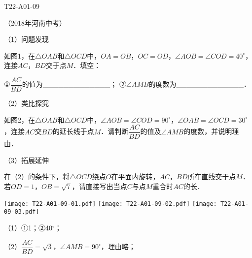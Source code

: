 \begin{defproblem}{T22-A01-09}%
\begin{onlyproblem}%
（2018年河南中考）

（1）问题发现

如图1，在$\triangle OAB$和$\triangle OCD$中，$OA=OB$，$OC=OD$，$\angle AOB=\angle COD=40^{\circ }$，连接$AC$，$BD$交于点$M$．填空：

①$\dfrac{AC}{BD}$的值为{\_}{\_}{\_}{\_}{\_}{\_}{\_}{\_}{\_}{\_}{\_}{\_}{\_}；
②$\angle AMB$的度数为{\_}{\_}{\_}{\_}{\_}{\_}{\_}{\_}{\_}{\_}{\_}{\_}{\_}．

（2）类比探究

如图2，在$\triangle OAB$和$\triangle OCD$中，$\angle AOB=\angle COD=90^{\circ }$，$\angle OAB=\angle OCD=30^{\circ }$，连接$AC$交$BD$的延长线于点$M$．请判断$\dfrac{AC}{BD}$的值及$\angle AMB$的度数，并说明理由．

（3）拓展延伸

在（2）的条件下，将$\triangle OCD$绕点$O$在平面内旋转，$AC$，$BD$所在直线交于点$M$．若$OD=1$，$OB=\sqrt 7 $，请直接写出当点$C$与点$M$重合时$AC$的长．


\begin{center}
\texttt{[image: T22-A01-09-01.pdf]}\qquad
\texttt{[image: T22-A01-09-02.pdf]}\qquad
\texttt{[image: T22-A01-09-03.pdf]}
\end{center}



\end{onlyproblem}%
\begin{onlysolution}%
（1）①1；②40$^{\circ }$；

（2）$\dfrac{AC}{BD}=\sqrt 3 $，$\angle AMB=90^{\circ }$，理由略；
\begin{center}
\end{center}
\end{onlysolution}%
\end{defproblem}


